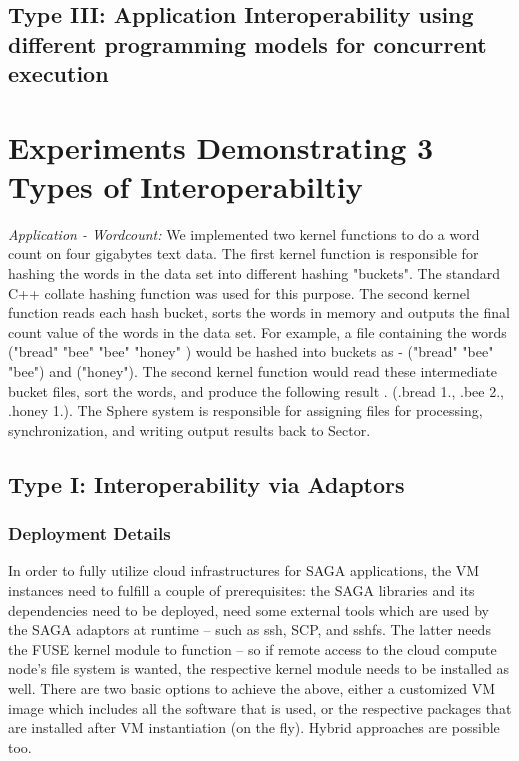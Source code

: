\documentclass[3p,twocolumn]{elsarticle}
\begin{document}
\subsection{Type III: Application Interoperability using different
  programming models for concurrent execution}


            

\section{Experiments Demonstrating 3 Types of Interoperabiltiy}
\label{sec:exp}

{\it Application - Wordcount: } We implemented two kernel functions to
do a word count on four gigabytes text data.  The first kernel
function is responsible for hashing the words in the data set into
different hashing "buckets". The standard C++ collate hashing function
was used for this purpose. The second kernel function reads each hash
bucket, sorts the words in memory and outputs the final count value of
the words in the data set.  For example, a file containing the words
("bread" "bee" "bee" "honey" ) would be hashed into buckets as -
("bread" "bee" "bee") and ("honey").  The second kernel function would
read these intermediate bucket files, sort the words, and produce the
following result . (.bread 1., .bee 2., .honey 1.).  The Sphere system
is responsible for assigning files for processing, synchronization,
and writing output results back to Sector.


\subsection{Type I: Interoperability via Adaptors}

\subsubsection{Deployment Details}

In order to fully utilize cloud infrastructures for SAGA applications,
the VM instances need to fulfill a couple of prerequisites: the SAGA
libraries and its dependencies need to be deployed, need some external
tools which are used by the SAGA adaptors at runtime -- such as ssh,
SCP, and sshfs.  The latter needs the FUSE kernel module to function
-- so if remote access to the cloud compute node's file system is
wanted, the respective kernel module needs to be installed as well.
There are two basic options to achieve the above, either a customized
VM image which includes all the software that is used, or the
respective packages that are installed after VM instantiation (on the
fly).  Hybrid approaches are possible too.
\end{document}
